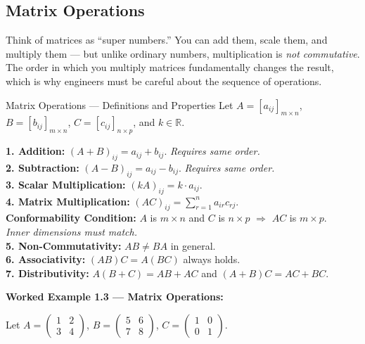 \documentclass[12pt,a4paper]{article}
\begin{document}
\subsection{Matrix Operations}

Think of matrices as ``super numbers.'' You can add them, scale them, and multiply them --- but unlike ordinary numbers, multiplication is \emph{not commutative}. The order in which you multiply matrices fundamentally changes the result, which is why engineers must be careful about the sequence of operations.

\begin{infobox}{Matrix Operations --- Definitions and Properties}
Let $A = [a_{ij}]_{m \times n}$, $B = [b_{ij}]_{m \times n}$, $C = [c_{ij}]_{n \times p}$, and $k \in \mathbb{R}$.

\textbf{1. Addition:} $(A + B)_{ij} = a_{ij} + b_{ij}$. \emph{Requires same order.} \\
\textbf{2. Subtraction:} $(A - B)_{ij} = a_{ij} - b_{ij}$. \emph{Requires same order.} \\
\textbf{3. Scalar Multiplication:} $(kA)_{ij} = k \cdot a_{ij}$. \\
\textbf{4. Matrix Multiplication:} $(AC)_{ij} = \sum_{r=1}^{n} a_{ir} c_{rj}$. \\
\quad \textbf{Conformability Condition:} $A$ is $m \times n$ and $C$ is $n \times p$ $\Rightarrow$ $AC$ is $m \times p$. \\
\quad \emph{Inner dimensions must match.} \\
\textbf{5. Non-Commutativity:} $AB \neq BA$ in general. \\
\textbf{6. Associativity:} $(AB)C = A(BC)$ always holds. \\
\textbf{7. Distributivity:} $A(B + C) = AB + AC$ and $(A + B)C = AC + BC$.
\end{infobox}

\textbf{Worked Example 1.3 --- Matrix Operations:}

Let $A = \begin{pmatrix} 1 & 2 \\ 3 & 4 \end{pmatrix}$, $B = \begin{pmatrix} 5 & 6 \\ 7 & 8 \end{pmatrix}$, $C = \begin{pmatrix} 1 & 0 \\ 0 & 1 \end{pmatrix}$.
\end{document}
